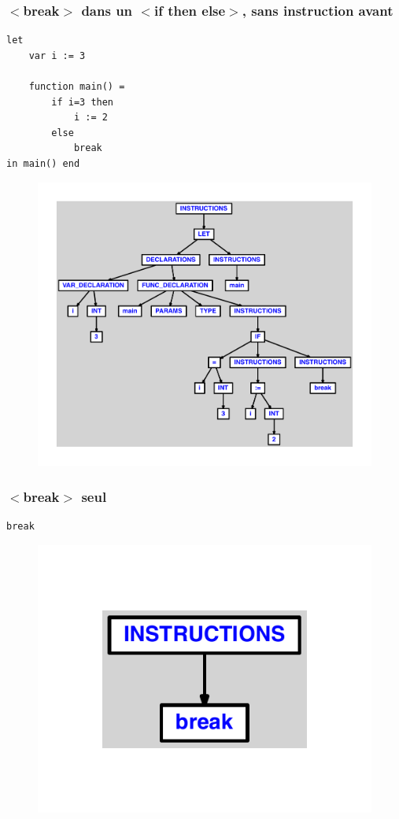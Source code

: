 \documentclass{article}
\begin{document}
\subsubsection{$ < $break$ > $ dans un $ < $if then else$ > $, sans instruction avant}
\begin{lstlisting}
let
	var i := 3

	function main() =
		if i=3 then
			i := 2
		else
			break
in main() end
\end{lstlisting}
\newpage
\begin{figure}[H]
\centering
\includegraphics[max width=\textwidth]{ast/ast_19.pdf}
\end{figure}
\newpage
\subsubsection{$ < $break$ > $ seul}
\begin{lstlisting}
break
\end{lstlisting}
\newpage
\begin{figure}[H]
\centering
\includegraphics[max width=\textwidth]{ast/ast_20.pdf}
\end{figure}
\newpage
\end{document}
